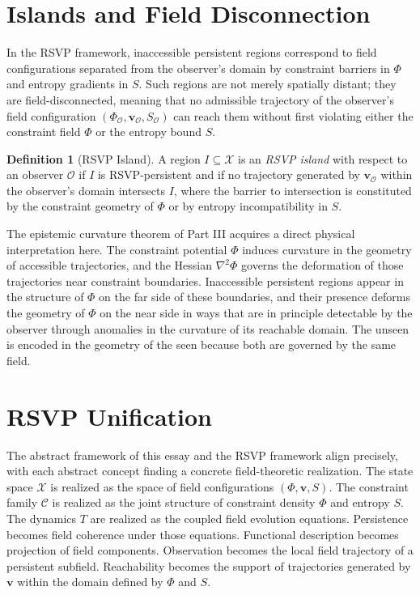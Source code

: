 \documentclass[12pt, a4paper, oneside]{article}
\theoremstyle{plain}
\theoremstyle{definition}
\newtheorem{definition}[theorem]{Definition}
\theoremstyle{remark}
\newcommand{\X}{\mathcal{X}}
\newcommand{\C}{\mathcal{C}}
\newcommand{\Obs}{\mathcal{O}}
\newcommand{\T}{T}
\begin{document}
\section{Islands and Field Disconnection}

In the RSVP framework, inaccessible persistent regions correspond to field configurations separated from the observer's domain by constraint barriers in $\Phi$ and entropy gradients in $S$. Such regions are not merely spatially distant; they are field-disconnected, meaning that no admissible trajectory of the observer's field configuration $(\Phi_\Obs, \mathbf{v}_\Obs, S_\Obs)$ can reach them without first violating either the constraint field $\Phi$ or the entropy bound $S$.

\begin{definition}[RSVP Island]
A region $I \subseteq \X$ is an \emph{RSVP island} with respect to an observer $\Obs$ if $I$ is RSVP-persistent and if no trajectory generated by $\mathbf{v}_\Obs$ within the observer's domain intersects $I$, where the barrier to intersection is constituted by the constraint geometry of $\Phi$ or by entropy incompatibility in $S$.
\end{definition}

The epistemic curvature theorem of Part III acquires a direct physical interpretation here. The constraint potential $\Phi$ induces curvature in the geometry of accessible trajectories, and the Hessian $\nabla^2 \Phi$ governs the deformation of those trajectories near constraint boundaries. Inaccessible persistent regions appear in the structure of $\Phi$ on the far side of these boundaries, and their presence deforms the geometry of $\Phi$ on the near side in ways that are in principle detectable by the observer through anomalies in the curvature of its reachable domain. The unseen is encoded in the geometry of the seen because both are governed by the same field.

\section{RSVP Unification}

The abstract framework of this essay and the RSVP framework align precisely, with each abstract concept finding a concrete field-theoretic realization. The state space $\X$ is realized as the space of field configurations $(\Phi, \mathbf{v}, S)$. The constraint family $\C$ is realized as the joint structure of constraint density $\Phi$ and entropy $S$. The dynamics $\T$ are realized as the coupled field evolution equations. Persistence becomes field coherence under those equations. Functional description becomes projection of field components. Observation becomes the local field trajectory of a persistent subfield. Reachability becomes the support of trajectories generated by $\mathbf{v}$ within the domain defined by $\Phi$ and $S$.
\end{document}
